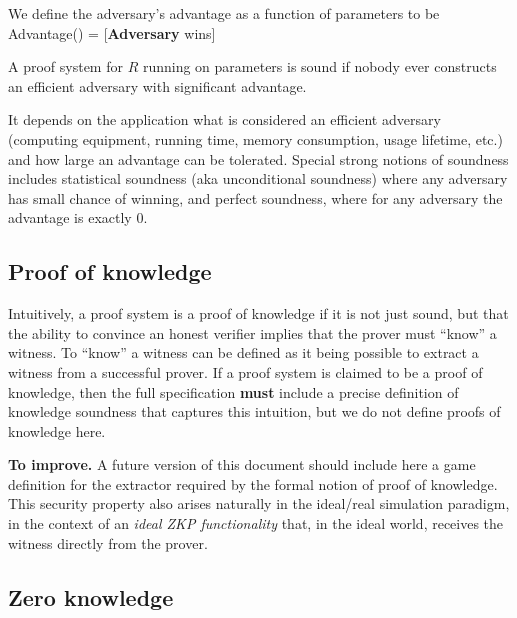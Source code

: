We define the adversary’s advantage as a function of parameters to be \newline
\hphantom{We define the } Advantage(\params) = [\textbf{Adversary} wins]
 
A proof system for $R$ running on parameters is sound if nobody ever constructs an efficient adversary with significant advantage.
 
It depends on the application what is considered an efficient adversary (computing equipment, running time, memory consumption, usage lifetime, etc.) and how large an advantage can be tolerated. 
Special strong notions of soundness includes statistical soundness (aka unconditional soundness) where any adversary has small chance of winning, and perfect soundness, where for any adversary the advantage is exactly 0.


\subsection{Proof of knowledge}
\label{sec:security:defs-props:proof-of-knowledge}

 Intuitively, a proof system is a proof of knowledge if it is not just sound, but that the ability to convince an honest verifier implies that the prover must “know” a witness. 
To “know” a witness can be defined as it being possible to extract a witness from a successful prover. 
If a proof system is claimed to be a proof of knowledge, then the full specification \textbf{must} include a precise definition of knowledge soundness that captures this intuition, but we do not define proofs of knowledge here.


\textbf{To improve.}
	A future version of this document should include here a game definition for the extractor required by the formal notion of proof of knowledge.
	This security property also arises naturally in the ideal/real simulation 
paradigm, in the context of an \emph{ideal ZKP functionality} that, 
in the ideal world, receives the witness directly from the prover.


\subsection{Zero knowledge}
\label{sec:security:defs-props:zero-knowledge}


